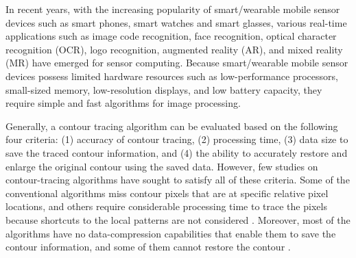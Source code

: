 
In recent years, with the increasing popularity of smart/wearable mobile sensor devices \cite{Aroca2013Wearable} such as smart phones, smart watches and smart glasses, various real-time applications such as image code recognition, face recognition, optical character recognition (OCR), logo recognition, augmented reality (AR), and mixed reality (MR) have emerged for sensor computing\cite{Wakaumi20062D,Brodic2010Basic,Kim2006Rapid,Tian2010RealTime,Zhang2012Robust}. Because smart/wearable mobile sensor devices possess limited hardware resources such as low-performance processors, small-sized memory, low-resolution displays, and low battery capacity, they require simple and fast algorithms for image processing. 


Generally, a contour tracing algorithm can be evaluated based on the following four criteria: (1) accuracy of contour tracing, (2) processing time, (3) data size to save the traced contour information, and (4) the ability to accurately restore and enlarge the original contour using the saved data. However, few studies on contour-tracing algorithms have sought to satisfy all of these criteria. Some of the conventional algorithms miss contour pixels that are at specific relative pixel locations, and others require considerable processing time to trace the pixels because shortcuts to the local patterns are not considered \cite{Cheong2006Improved,Cheong2012Advanced}. Moreover, most of the algorithms have no data-compression capabilities that enable them to save the contour information, and some of them cannot restore the contour \cite{Miyatake1997Contour}. 

